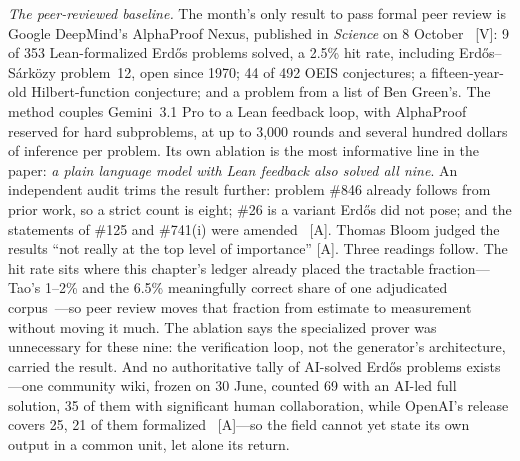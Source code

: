 \emph{The peer-reviewed baseline.} The month's only result to pass formal peer review is Google DeepMind's AlphaProof Nexus, published in \emph{Science} on 8 October~\cite{sci-alphaproof-nexus} [V]: 9 of 353 Lean-formalized Erd\H{o}s problems solved, a 2.5\% hit rate, including Erd\H{o}s--S\'ark\"ozy problem~12, open since 1970; 44 of 492 OEIS conjectures; a fifteen-year-old Hilbert-function conjecture; and a problem from a list of Ben Green's. The method couples Gemini~3.1 Pro to a Lean feedback loop, with AlphaProof reserved for hard subproblems, at up to 3,000 rounds and several hundred dollars of inference per problem. Its own ablation is the most informative line in the paper: \emph{a plain language model with Lean feedback also solved all nine}. An independent audit trims the result further: problem \#846 already follows from prior work, so a strict count is eight; \#26 is a variant Erd\H{o}s did not pose; and the statements of \#125 and \#741(i) were amended~\cite{sci-papex-erdos} [A]. Thomas Bloom judged the results ``not really at the top level of importance'' [A]. Three readings follow. The hit rate sits where this chapter's ledger already placed the tractable fraction---Tao's 1--2\% and the 6.5\% meaningfully correct share of one adjudicated corpus~\cite{tao,aletheia}---so peer review moves that fraction from estimate to measurement without moving it much. The ablation says the specialized prover was unnecessary for these nine: the verification loop, not the generator's architecture, carried the result. And no authoritative tally of AI-solved Erd\H{o}s problems exists---one community wiki, frozen on 30 June, counted 69 with an AI-led full solution, 35 of them with significant human collaboration, while OpenAI's release covers 25, 21 of them formalized~\cite{sci-papex-erdos} [A]---so the field cannot yet state its own output in a common unit, let alone its return.

